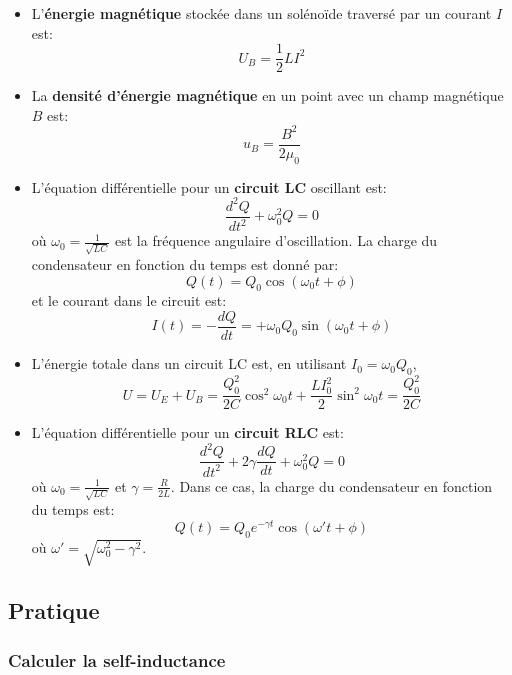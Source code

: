 \documentclass[a4paper]{article}
\begin{document}
\begin{itemize}
    \item L'\textbf{énergie magnétique} stockée dans un solénoïde traversé par un courant $ I $ est: 
\[ U_B = \frac{1}{2} L I^2 \]
    \item La \textbf{densité d'énergie magnétique} en un point avec un champ magnétique $ B $ est: 
\[ u_B = \frac{B^2}{2 \mu_0} \]
    \item L'équation différentielle pour un \textbf{circuit LC} oscillant est: 
\[ \frac{d^2 Q}{d t^2} + \omega_0^2 Q = 0 \]
où $\displaystyle \omega_0 = \frac{1}{\sqrt{LC}} $ est la fréquence angulaire d'oscillation. La charge du condensateur en fonction du temps est donné par: 
\[ Q(t) = Q_0 \cos (\omega_0 t + \phi) \]
et le courant dans le circuit est: 
\[ I(t) = - \frac{d Q}{d t} = + \omega_0 Q_0 \sin (\omega_0 t + \phi) \]
    \item L'énergie totale dans un circuit LC est, en utilisant $\displaystyle I_0 = \omega_0 Q_0 $, 
\[ U = U_E + U_B = \frac{Q_0^2}{2 C} \cos^2 \omega_0 t + \frac{L I_0^2}{2} \sin^2 \omega_0 t = \frac{Q_0^2}{2 C} \]
    \item L'équation différentielle pour un \textbf{circuit RLC} est: 
\[ \frac{d^2 Q}{d t^2} + 2 \gamma \frac{d Q}{d t} + \omega_0^2 Q = 0 \]
où $\displaystyle \omega_0 = \frac{1}{\sqrt{LC}} $ et $\displaystyle \gamma = \frac{R}{2 L} $. Dans ce cas, la charge du condensateur en fonction du temps est: 
\[ Q(t) = Q_0 e^{- \gamma t} \cos (\omega ' t + \phi) \]
où $\displaystyle \omega ' = \sqrt{\omega_0^2 - \gamma^2} $.
\end{itemize}
















\subsection{Pratique}









\subsubsection{Calculer la self-inductance}
\end{document}
